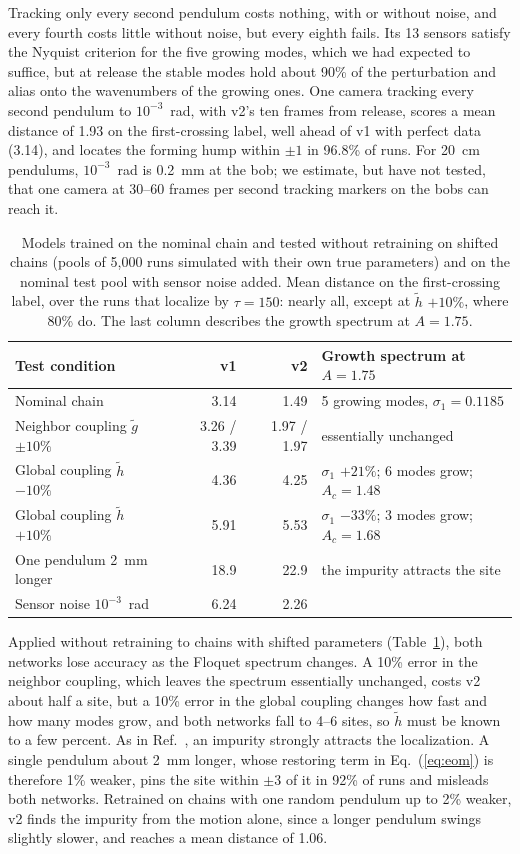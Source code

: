 \documentclass[11pt]{article}
\newcommand{\gt}{\tilde g}
\newcommand{\htl}{\tilde h}
\begin{document}
Tracking only every second pendulum costs nothing, with or without noise, and every fourth costs little without noise, but every eighth fails. Its 13 sensors satisfy the Nyquist criterion for the five growing modes, which we had expected to suffice, but at release the stable modes hold about 90\% of the perturbation and alias onto the wavenumbers of the growing ones. One camera tracking every second pendulum to $10^{-3}$~rad, with v2's ten frames from release, scores a mean distance of 1.93 on the first-crossing label, well ahead of v1 with perfect data (3.14), and locates the forming hump within $\pm1$ in 96.8\% of runs. For 20~cm pendulums, $10^{-3}$~rad is 0.2~mm at the bob; we estimate, but have not tested, that one camera at 30--60 frames per second tracking markers on the bobs can reach it.

\begin{table}[t]
  \centering
  \caption{Models trained on the nominal chain and tested without retraining on shifted chains (pools of 5,000 runs simulated with their own true parameters) and on the nominal test pool with sensor noise added. Mean distance on the first-crossing label, over the runs that localize by $\tau=150$: nearly all, except at $\htl$ $+10\%$, where 80\% do. The last column describes the growth spectrum at $A=1.75$.}
  \label{tab:robust}
  \small
  \begin{tabular}{@{}lrrl@{}}
    \toprule
    Test condition & v1 & v2 & Growth spectrum at $A=1.75$ \\
    \midrule
    Nominal chain & 3.14 & 1.49 & 5 growing modes, $\sigma_1=0.1185$ \\
    Neighbor coupling $\gt$ $\pm10\%$ & 3.26 / 3.39 & 1.97 / 1.97 & essentially unchanged \\
    Global coupling $\htl$ $-10\%$ & 4.36 & 4.25 & $\sigma_1$ $+21\%$; 6 modes grow; $A_c=1.48$ \\
    Global coupling $\htl$ $+10\%$ & 5.91 & 5.53 & $\sigma_1$ $-33\%$; 3 modes grow; $A_c=1.68$ \\
    One pendulum 2~mm longer & 18.9 & 22.9 & the impurity attracts the site \\
    Sensor noise $10^{-3}$~rad & 6.24 & 2.26 & \\
    \bottomrule
  \end{tabular}
\end{table}

Applied without retraining to chains with shifted parameters (Table~\ref{tab:robust}), both networks lose accuracy as the Floquet spectrum changes. A 10\% error in the neighbor coupling, which leaves the spectrum essentially unchanged, costs v2 about half a site, but a 10\% error in the global coupling changes how fast and how many modes grow, and both networks fall to 4--6 sites, so $\htl$ must be known to a few percent. As in Ref.~\cite{mittal2026jand}, an impurity strongly attracts the localization. A single pendulum about 2~mm longer, whose restoring term in Eq.~(\ref{eq:eom}) is therefore 1\% weaker, pins the site within $\pm3$ of it in 92\% of runs and misleads both networks. Retrained on chains with one random pendulum up to 2\% weaker, v2 finds the impurity from the motion alone, since a longer pendulum swings slightly slower, and reaches a mean distance of 1.06.
\end{document}

